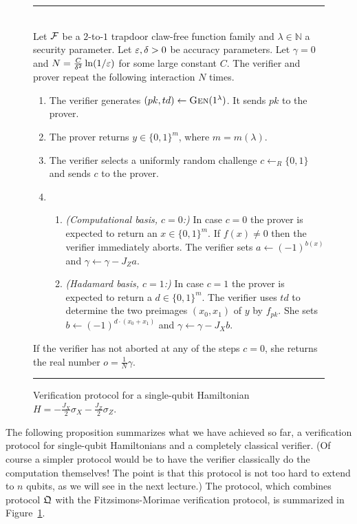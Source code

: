 \begin{figure}[htbp]
\rule[1ex]{16.5cm}{0.5pt}\\
Let $\mathcal{F}$ be a $2$-to-$1$ trapdoor claw-free function family and $\lambda\in\mathbb{N}$ a security parameter. Let $\varepsilon,\delta>0$ be accuracy parameters.  Let $\gamma = 0$ and $N = \frac{C}{\delta^2} \ln(1/\varepsilon)$ for some large constant $C$.
The verifier and prover repeat the following interaction $N$ times.
 \begin{enumerate}
\item The verifier generates $(pk,td)\leftarrow \textsc{Gen}(1^\lambda)$. It sends $pk$ to the prover. 
\item The prover returns $y \in \{0,1\}^m$, where $m=m(\lambda)$. 
\item The verifier selects a uniformly random challenge $c\leftarrow_R \{0,1\}$ and sends $c$ to the prover. 
\item 
\begin{enumerate}
\item \emph{(Computational basis, $c=0$:)} In case $c=0$ the prover is expected to return an $x\in\{0,1\}^m$. If $f(x)\neq 0$ then the verifier immediately aborts. The verifier sets $a\leftarrow (-1)^{b(x)}$ and $\gamma \leftarrow \gamma - J_Z a$. 
\item \emph{(Hadamard basis, $c=1$:)} In case $c=1$ the prover is expected to return a $d\in \{0,1\}^m$. The verifier uses $td$ to determine the two preimages $(x_0,x_1)$ of $y$ by $f_{pk}$. She sets $b\leftarrow (-1)^{d\cdot(x_0+ x_1)}$ and $\gamma \leftarrow \gamma - J_X b$. 
\end{enumerate}
\end{enumerate}
If the verifier has not aborted at any of the steps $c=0$, she returns the real number $o=\frac{1}{N}\gamma$. 
\rule[1ex]{16.5cm}{0.5pt}
\caption{Verification protocol for a single-qubit Hamiltonian $H = -\frac{J_X}{2} \sigma_X - \frac{J_Z}{2}\sigma_Z$.}
\label{fig:protocol-mahadev-oq}
\end{figure}

The following proposition summarizes what we have achieved so far, a verification protocol for single-qubit Hamiltonians and a completely classical verifier. (Of course a simpler protocol would be to have the verifier classically do the computation themselves! The point is that this protocol is not too hard to extend to $n$ qubits, as we will see in the next lecture.) The protocol, which combines protocol $\mathfrak{Q}$ with the Fitzsimons-Morimae verification protocol, is summarized in Figure~\ref{fig:protocol-mahadev-oq}. 

